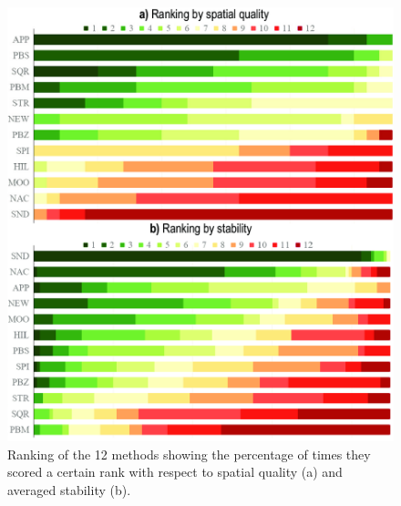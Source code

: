 \begin{figure}[htbp!]
\centering
\includegraphics[width=1.\textwidth]{figures/initial-treemap-evaluation/rank-vertical.png}
\vspace{-0.1cm}
\caption{Ranking of the 12 methods showing the percentage of times they scored a certain rank with respect to spatial quality (a) and averaged stability (b).}
\vspace{-0.2cm}
\label{fig:rankchart}
\end{figure}

